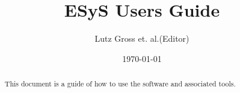 \documentclass{manual}
\title{ESyS Users Guide}
\author{Lutz Gross et. al.(Editor)}
\date{\today}
\begin{document}
\maketitle



\begin{abstract}
This document is a guide of how to use the \ESyS software and
associated tools.
\end{abstract}

\tableofcontents








%



\makemodindex

\printindex
%



\end{document}
